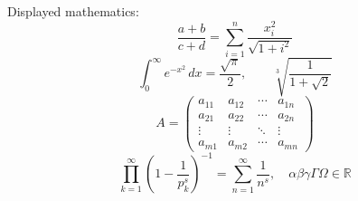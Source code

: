 \documentclass{article}
\begin{document}
Displayed mathematics:
\[ \frac{a+b}{c+d} = \sum_{i=1}^{n} \frac{x_i^2}{\sqrt{1+i^2}} \]
\[ \int_0^\infty e^{-x^2}\,dx = \frac{\sqrt{\pi}}{2}, \qquad
   \sqrt[3]{\frac{1}{1+\sqrt{2}}} \]
\[ A = \begin{pmatrix} a_{11} & a_{12} & \cdots & a_{1n} \\
 a_{21} & a_{22} & \cdots & a_{2n} \\ \vdots & \vdots & \ddots & \vdots \\
 a_{m1} & a_{m2} & \cdots & a_{mn} \end{pmatrix} \]
\[ \prod_{k=1}^{\infty}\left(1-\frac{1}{p_k^{s}}\right)^{-1}
   = \sum_{n=1}^{\infty} \frac{1}{n^s}, \quad
\alpha\beta\gamma\Gamma\Omega\in\mathbb{R} \]
\end{document}
